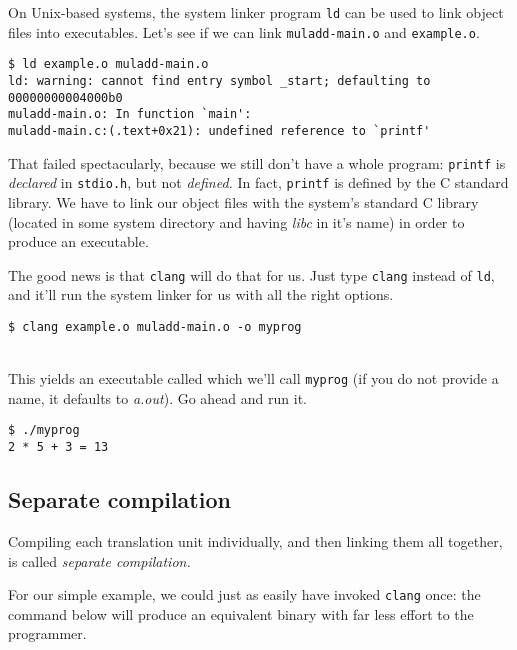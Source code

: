 \documentclass[12pt,a4paper]{article}
\newcommand{\C}{C}
\newcommand{\clang}{\texttt{clang}}
\newcommand{\CC}{\clang{}}
\newcommand{\syslinker}{\texttt{ld}}
\newcommand{\labelname}[1]{\texttt{#1}}
\newcommand{\functionname}[1]{\labelname{#1}}
\newcommand{\filename}[1]{\texttt{#1}}
\begin{document}
On Unix-based systems, the system linker program \syslinker{} can be used to link object files into executables. Let's see if we can link \filename{muladd-main.o} and \filename{example.o}.

\begin{lstlisting}[caption=output for \texttt{ld example.o muladd-main.o},label=lst:ld-muladd-muladd-main]
$ ld example.o muladd-main.o
ld: warning: cannot find entry symbol _start; defaulting to 00000000004000b0
muladd-main.o: In function `main':
muladd-main.c:(.text+0x21): undefined reference to `printf'
\end{lstlisting}

That failed spectacularly, because we still don't have a whole program: \functionname{printf} is \emph{declared} in \filename{stdio.h}, but not \emph{defined.} In fact, \functionname{printf} is defined by the \C{} standard library. We have to link our object files with the system's standard C library (located in some system directory and having \emph{libc} in it's name) in order to produce an executable.

The good news is that \CC{} will do that for us. Just type \CC{} instead of \syslinker{}, and it'll run the system linker for us with all the right options. \\

\begin{lstlisting}[caption=linking \filename{example.o} and \filename{muladd-main.o}]
$ clang example.o muladd-main.o -o myprog
\end{lstlisting}
\ \\
\noindent This yields an executable called which we'll call \filename{myprog} (if you do not provide a name, it defaults to \emph{a.out}). Go ahead and run it.\\

\begin{lstlisting}[caption=output for \texttt{myprog}]
$ ./myprog 
2 * 5 + 3 = 13 
\end{lstlisting}

\subsection{Separate compilation}

Compiling each translation unit individually, and then linking them all together, is called \emph{separate compilation.}

For our simple example, we could just as easily have invoked \CC{} once: the command below will produce an equivalent binary with far less effort to the programmer.\\
\end{document}
